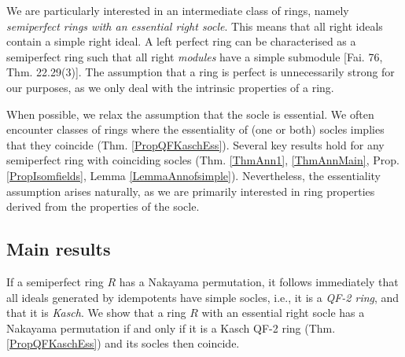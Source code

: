 \documentclass[11pt]{article}
\theoremstyle{plain}
\theoremstyle{remark}
\theoremstyle{plain}
\begin{document}
\begin{figure}[ht]
{
    }
    \label{FigRingImplications}
\end{figure}
We are particularly interested in an intermediate class of rings, namely \textit{semiperfect rings with an essential right socle}.  This means that all right ideals contain a simple right ideal. A left perfect ring can be characterised as a semiperfect ring such that all right \textit{modules} have a simple submodule [Fai. 76, Thm. 22.29(3)].  The assumption that a ring is perfect is unnecessarily strong for our purposes, as we only deal with the intrinsic properties of a ring.  

When possible, we relax the assumption that the socle is essential. We often encounter classes of rings where the essentiality of (one or both) socles implies that they coincide (Thm. \ref{PropQFKaschEss}). Several key results hold for any semiperfect ring with coinciding socles (Thm. \ref{ThmAnn1}, \ref{ThmAnnMain}, Prop. \ref{PropIsomfields}, Lemma \ref{LemmaAnnofsimple}). Nevertheless, the essentiality assumption arises naturally, as we are primarily interested in ring properties derived from the properties of the socle.


\subsection{Main results}

If a semiperfect ring $R$ has a Nakayama permutation, it follows immediately that all ideals generated by idempotents have simple socles, i.e., it is a \textit{QF-2 ring}, and that it is \textit{Kasch}. We show that a ring $R$ with an essential right socle has a Nakayama permutation if and only if it is a Kasch QF-2 ring (Thm. \ref{PropQFKaschEss}) and its socles then coincide.
\end{document}
